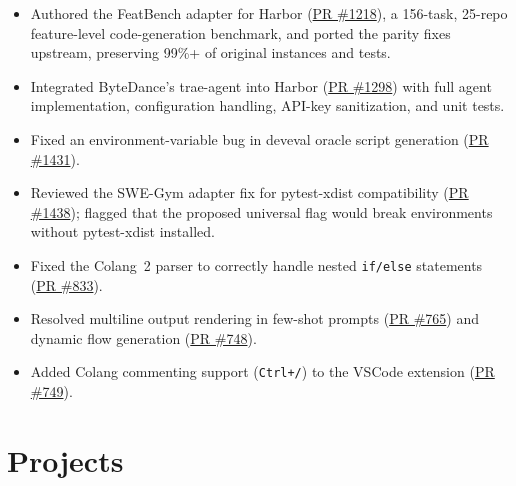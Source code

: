 \documentclass[11pt,letterpaper]{article}
\begin{document}
\begin{itemize}
  \item Authored the FeatBench adapter for Harbor (\href{https://github.com/harbor-framework/harbor/pull/1218}{PR \#1218}), a 156-task, 25-repo feature-level code-generation benchmark, and ported the parity fixes upstream, preserving 99\%+ of original instances and tests.
  \item Integrated ByteDance's trae-agent into Harbor (\href{https://github.com/harbor-framework/harbor/pull/1298}{PR \#1298}) with full agent implementation, configuration handling, API-key sanitization, and unit tests.
  \item Fixed an environment-variable bug in deveval oracle script generation (\href{https://github.com/harbor-framework/harbor/pull/1431}{PR \#1431}).
  \item Reviewed the SWE-Gym adapter fix for pytest-xdist compatibility (\href{https://github.com/harbor-framework/harbor/pull/1438}{PR \#1438}); flagged that the proposed universal flag would break environments without pytest-xdist installed.
\end{itemize}

\begin{itemize}
  \item Fixed the Colang~2 parser to correctly handle nested \texttt{if/else} statements (\href{https://github.com/NVIDIA-NeMo/Guardrails/pull/833}{PR \#833}).
  \item Resolved multiline output rendering in few-shot prompts (\href{https://github.com/NVIDIA-NeMo/Guardrails/pull/765}{PR \#765}) and dynamic flow generation (\href{https://github.com/NVIDIA-NeMo/Guardrails/pull/748}{PR \#748}).
  \item Added Colang commenting support (\texttt{Ctrl+/}) to the VSCode extension (\href{https://github.com/NVIDIA-NeMo/Guardrails/pull/749}{PR \#749}).
\end{itemize}

\section*{Projects}
\end{document}
